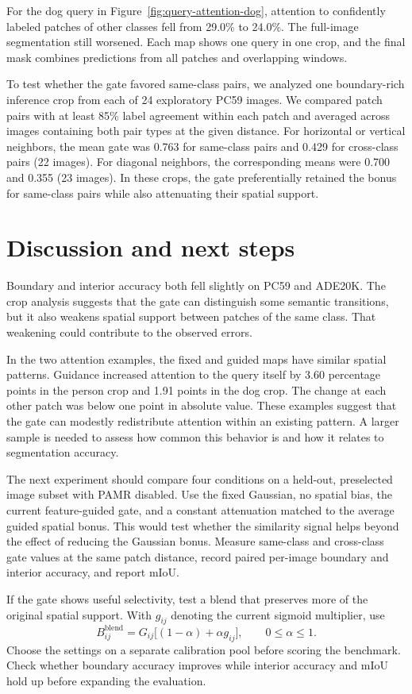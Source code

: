 For the dog query in Figure~\ref{fig:query-attention-dog}, attention to
confidently labeled patches of other classes fell from 29.0\% to 24.0\%.
The full-image segmentation still worsened. Each map shows one query in one
crop, and the final mask combines predictions from all patches and
overlapping windows.

To test whether the gate favored same-class pairs, we analyzed one
boundary-rich inference crop from each of 24 exploratory PC59 images.
We compared patch pairs with at least 85\% label agreement within each patch
and averaged across images containing both pair types at the given distance.
For horizontal or vertical neighbors, the mean gate was 0.763 for same-class
pairs and 0.429 for cross-class pairs (22 images). For diagonal neighbors,
the corresponding means were 0.700 and 0.355 (23 images). In these crops,
the gate preferentially retained the bonus for same-class pairs while also
attenuating their spatial support.

\section{Discussion and next steps}
Boundary and interior accuracy both fell slightly on PC59 and ADE20K.
The crop analysis suggests that the gate can distinguish some semantic
transitions, but it also weakens spatial support between patches of the same
class. That weakening could contribute to the observed errors.

In the two attention examples, the fixed and guided maps have similar
spatial patterns. Guidance increased attention to the query itself by
3.60 percentage points in the person crop and 1.91 points in the dog
crop. The change at each other patch was below one point in absolute
value. These examples suggest that the gate can modestly redistribute
attention within an existing pattern. A larger sample is needed to assess
how common this behavior is and how it relates to segmentation accuracy.

The next experiment should compare four conditions on a held-out,
preselected image subset with PAMR disabled. Use the fixed Gaussian, no
spatial bias, the current feature-guided gate, and a constant attenuation
matched to the average guided spatial bonus. This would test whether the
similarity signal helps beyond the effect of reducing the Gaussian bonus.
Measure same-class and cross-class gate values at the same patch distance,
record paired per-image boundary and interior accuracy, and report mIoU.

If the gate shows useful selectivity, test a blend that preserves more of
the original spatial support. With $g_{ij}$ denoting the current sigmoid
multiplier, use
\[
    B_{ij}^{\mathrm{blend}} = G_{ij}\bigl[(1-\alpha)+\alpha g_{ij}\bigr],
    \qquad 0\leq\alpha\leq1.
\]
Choose the settings on a separate calibration pool before scoring the
benchmark. Check whether boundary accuracy improves while interior accuracy
and mIoU hold up before expanding the evaluation.
